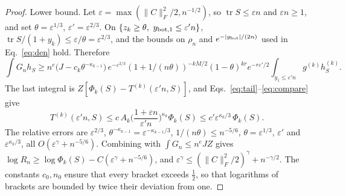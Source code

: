 \documentclass[11pt]{article}
\newcommand{\tr}{\operatorname{tr}}
\theoremstyle{remark}
\begin{document}
\begin{proof}
Lower bound.
Let $\varepsilon=\max(\lVert C\rVert_F^2/2,n^{-1/2})$, so $\tr S\le\varepsilon n$ and $\varepsilon n\ge1$, and set $\theta=\varepsilon^{1/3}$, $\varepsilon'=\varepsilon^{2/3}$.
On $\{z_k\ge\theta,\ y_{{\rm bot},1}\le\varepsilon'n\}$, $\tr S/(1+y_k)\le\varepsilon/\theta=\varepsilon^{2/3}$, and the bounds on $\rho_n$ and $e^{-\lvert y_{\rm bot}\rvert/(2n)}$ used in Eq.~\eqref{eq:den} hold.
Therefore
\begin{equation}
  \int G_nh_S\ge n^e\big(J-c_k\theta^{-\kappa_{k-1}}\big)\,e^{-\varepsilon^{2/3}}(1+1/(n\theta))^{-kM/2}(1-\theta)^{kr}e^{-r\varepsilon'/2}\int_{y_1\le\varepsilon'n}g^{(k)}h^{(k)}_S .
\end{equation}
The last integral is $Z[\Phi_k(S)-T^{(k)}(\varepsilon'n,S)]$, and Eqs.~\eqref{eq:tail}--\eqref{eq:compare} give
\begin{equation}
  T^{(k)}(\varepsilon'n,S)\le c\,A_k\Big(\frac{1+\varepsilon n}{\varepsilon'n}\Big)^{\kappa_k}\Phi_k(S)\le c'\varepsilon^{\kappa_k/3}\,\Phi_k(S).
\end{equation}
The relative errors are $\varepsilon^{2/3}$, $\theta^{-\kappa_{k-1}}=\varepsilon^{-\kappa_{k-1}/3}$, $1/(n\theta)\le n^{-5/6}$, $\theta=\varepsilon^{1/3}$, $\varepsilon'$ and $\varepsilon^{\kappa_k/3}$, all $O(\varepsilon^{\gamma}+n^{-5/6})$.
Combining with $\int G_n\le n^eJZ$ gives $\log R_n\ge\log\Phi_k(S)-C(\varepsilon^\gamma+n^{-5/6})$, and $\varepsilon^\gamma\le(\lVert C\rVert_F^2/2)^\gamma+n^{-\gamma/2}$.
The constants $c_0,n_0$ ensure that every bracket exceeds $\tfrac12$, so that logarithms of brackets are bounded by twice their deviation from one.
\end{proof}
\end{document}
